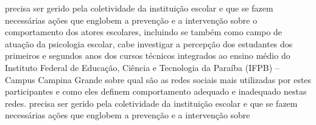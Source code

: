 precisa ser gerido pela coletividade da instituição escolar e que se fazem necessárias ações que englobem a prevenção e a intervenção sobre o comportamento dos atores escolares, incluindo se também como campo de atuação da psicologia escolar, cabe investigar a percepção dos estudantes dos primeiros e segundos anos dos cursos técnicos integrados ao ensino médio do Instituto Federal de Educação, Ciência e Tecnologia da Paraíba (IFPB) – Campus Campina Grande sobre qual são as redes sociais mais utilizadas por estes participantes e como eles definem comportamento adequado e inadequado nestas redes.
precisa ser gerido pela coletividade da instituição escolar e que se fazem necessárias ações que englobem a prevenção e a intervenção sobre 